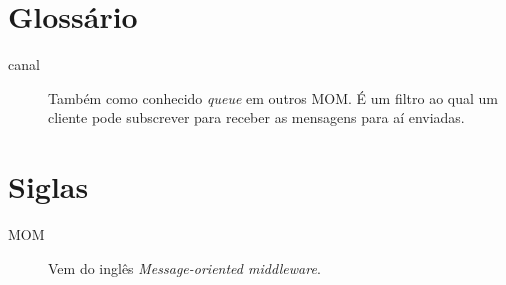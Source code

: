 \section{Glossário}
\begin{description}
\item[canal] Também como conhecido \textit{queue} em outros MOM. É um filtro ao qual um cliente pode subscrever para receber as mensagens para aí enviadas.

\end{description}


\section{Siglas}
\begin{description}
\item[MOM] Vem do inglês \textit{Message-oriented middleware}.
\end{description}